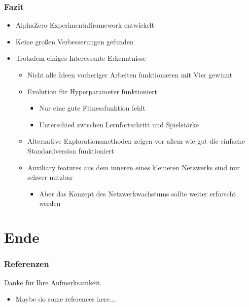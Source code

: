 \begin{frame}
 \frametitle{Fazit}
  


\begin{itemize}
  \item \pause AlphaZero Experimentalframework entwickelt
  \item \pause Keine großen Verbesserungen gefunden
  \item \pause Trotzdem einiges Interessante Erkenntnisse
\begin{itemize}
  \item \pause Nicht alle Ideen vorheriger Arbeiten funktionieren mit Vier gewinnt
  \item \pause Evolution für Hyperparameter funktioniert
\begin{itemize}
  \item \pause Nur eine gute Fitnessfunktion fehlt
  \item \pause Unterschied zwischen Lernfortschritt und Spielstärke
\end{itemize}
  \item \pause Alternative Explorationsmethoden zeigen vor allem wie gut die einfache Standardversion funktioniert
  \item \pause Auxiliary features aus dem inneren eines kleineren Netzwerks sind nur schwer nutzbar
\begin{itemize}
  \item \pause Aber das Konzept des Netzwerkwachstums sollte weiter erforscht werden
\end{itemize}
\end{itemize}
\end{itemize}


  
\end{frame}

\section{Ende}



\begin{frame}
 \frametitle{Referenzen}
  


\centering Danke für Ihre Aufmerksamkeit.


\begin{itemize}
  \item Maybe do some references here...
\end{itemize}



  
\end{frame}

